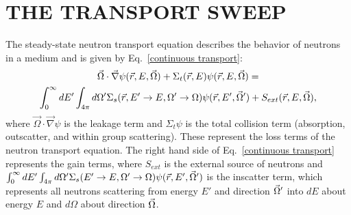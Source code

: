 %
%
%
%


\chapter{\uppercase {THE TRANSPORT SWEEP}}\label{cha:transport_sweeps}

The steady-state neutron transport equation describes the behavior of neutrons in a medium and is given by Eq.~\eqref{continuous transport}:
\begin{multline}
\vec{\Omega} \cdot \vec \nabla \psi(\vec{r},E,\vec{\Omega}) +\Sigma_t(\vec{r},E) \psi(\vec{r},E,\vec{\Omega})  = \\
\int_{0}^{\infty}dE' \int_{4\pi}d\Omega' \Sigma_s(\vec{r},E'\to E, \Omega'\to\Omega)\psi(\vec{r},E',\vec{\Omega}')
+ S_{ext}(\vec{r},E,\vec{\Omega}) ,
\label{continuous transport}
\end{multline}
where $\vec{\Omega}\cdot \vec\nabla\psi$ is the leakage term and $\Sigma_t\psi$ is the total collision term (absorption, outscatter, and within group scattering). These represent the loss terms of the neutron transport equation. The right hand side of Eq.~\eqref{continuous transport} represents the gain terms, where $S_{ext}$ is the external source of neutrons and $\int_{0}^{\infty}dE'\int_{4\pi}d\Omega'\Sigma_s(E'\to E, \Omega'\to\Omega)\psi(\vec{r},E',\vec{\Omega}')$ is the inscatter term, which represents all neutrons scattering from energy $E'$ and direction $\vec{\Omega}'$ into $dE$ about energy $E$ and $d\Omega$ about direction $\vec{\Omega}$.

